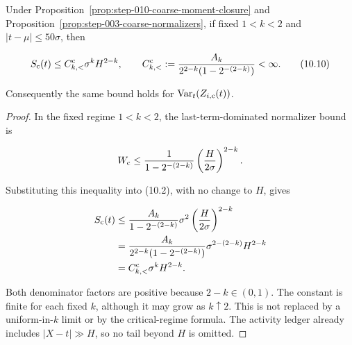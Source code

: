 \begin{lemma}\label{lem:step-010-subquadratic}
Under Proposition~\ref{prop:step-010-coarse-moment-closure} and Proposition~\ref{prop:step-003-coarse-normalizers}, if fixed
\(1<k<2\) and \(|t-\mu|\leq50\sigma\), then

\[
S_{\rm c}(t)
\leq C_{k,<}^{\rm c}\sigma^kH^{2-k},
\qquad
C_{k,<}^{\rm c}
:=\frac{A_k}{2^{2-k}(1-2^{-(2-k)})}<\infty.
\tag{10.10}
\]

Consequently the same bound holds for
\(\operatorname{Var}_t(Z_{i,{\rm c}}(t))\).
\end{lemma}

\begin{proof}
In the fixed regime \(1<k<2\), the last-term-dominated normalizer bound is

\[
W_{\rm c}
\leq\frac1{1-2^{-(2-k)}}
\left(\frac{H}{2\sigma}\right)^{2-k}.
\]

Substituting this inequality into (10.2), with no change to \(H\), gives

\[
\begin{aligned}
S_{\rm c}(t)
&\leq
\frac{A_k}{1-2^{-(2-k)}}\sigma^2
\left(\frac{H}{2\sigma}\right)^{2-k}\\
&=\frac{A_k}{2^{2-k}(1-2^{-(2-k)})}
  \sigma^{2-(2-k)}H^{2-k}\\
&=C_{k,<}^{\rm c}\sigma^kH^{2-k}.
\end{aligned}
\]

Both denominator factors are positive because \(2-k\in(0,1)\). The constant
is finite for each fixed \(k\), although it may grow as \(k\uparrow2\). This
is not replaced by a uniform-in-\(k\) limit or by the critical-regime formula.
The activity ledger already includes \(|X-t|\gg H\), so no tail beyond
\(H\) is omitted.
\end{proof}

